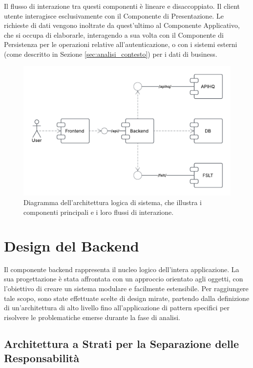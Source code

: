 \documentclass[12pt,a4paper,openright,twoside]{book}
\begin{document}
Il flusso di interazione tra questi componenti è lineare e disaccoppiato. Il client utente interagisce esclusivamente con il Componente di Presentazione. Le richieste di dati vengono inoltrate da quest'ultimo al Componente Applicativo, che si occupa di elaborarle, interagendo a sua volta con il Componente di Persistenza per le operazioni relative all'autenticazione, o con i sistemi esterni (come descritto in Sezione \ref{sec:analisi_contesto}) per i dati di business.


\begin{figure}[H]
    \centering
    \includegraphics[width=\textwidth]{figures/components.pdf}
    \caption{Diagramma dell'architettura logica di sistema, che illustra i componenti principali e i loro flussi di interazione.}
    \label{fig:logical_architecture_diagram}
\end{figure}



\section{Design del Backend}
\label{sec:design_backend_oop}

Il componente backend rappresenta il nucleo logico dell'intera applicazione. La sua progettazione è stata affrontata con un approccio orientato agli oggetti, con l'obiettivo di creare un sistema modulare e facilmente estensibile. Per raggiungere tale scopo, sono state effettuate scelte di design mirate, partendo dalla definizione di un'architettura di alto livello fino all'applicazione di pattern specifici per risolvere le problematiche emerse durante la fase di analisi.

\subsection{Architettura a Strati per la Separazione delle Responsabilità}
\label{subsec:design_layered}
\end{document}
